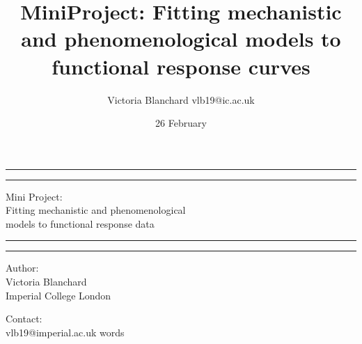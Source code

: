 \documentclass[11pt]{article}
\title {MiniProject: Fitting mechanistic and phenomenological models to functional response curves}
\author{Victoria Blanchard vlb19@ic.ac.uk}
\date{26 February}
\newcommand\wordcount{}
\begin{document}
	
	\begin{titlepage}
		
		
		\centering %
		
		
		
		
		\vspace*{5\baselineskip}
		
		\rule{\textwidth}{1.6pt}\vspace*{-\baselineskip}\vspace*{2pt} %
		\rule{\textwidth}{0.4pt} %
		
		\vspace{0.75\baselineskip} %
		
		{\LARGE Mini Project: \\ Fitting mechanistic and phenomenological \\ models to functional response data} 
		
		\vspace{0.75\baselineskip} %
		
		\rule{\textwidth}{0.4pt}\vspace*{-\baselineskip}\vspace{3.2pt} 
		\rule{\textwidth}{1.6pt} 
		
		\vspace{2\baselineskip} 
		
		
		Author: \\
		Victoria Blanchard \\
		Imperial College London
		
		\vspace{1.5 \baselineskip} %
		
		Contact: \\
		vlb19@imperial.ac.uk
		\mbox{}
		\vfill
		\wordcount words
		
	\end{titlepage}
	
	\linenumbers
	\doublespacing
	
\end{document}
